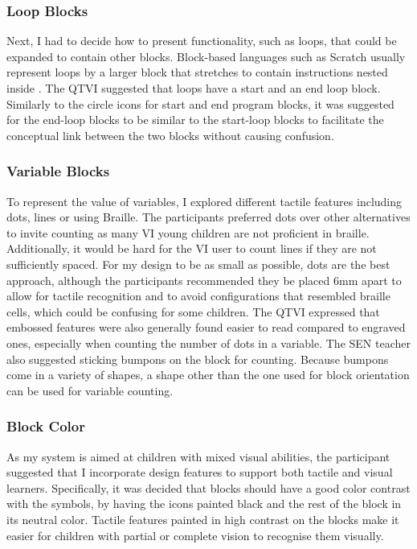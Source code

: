 \documentclass[oneside,%
                    author={Malak Hajji},
                    degree={BSc},
                    title={Designing An Accessible Computational Toolkit For Students},
                  subtitle={With Mixed Visual Abilities}]{dissertation}
\begin{document}
\subsubsection{Loop Blocks}
Next, I had to decide how to present functionality, such as loops, that could be expanded to contain other blocks.  Block-based languages such as Scratch usually represent loops by a larger block that stretches to contain instructions nested inside \cite{scratch}.
The QTVI suggested that loops have a start and an end loop block. Similarly to the circle icons for start and end program blocks, it was suggested for the end-loop blocks to be similar to the start-loop blocks to facilitate the conceptual link between the two blocks without causing confusion.
\subsubsection{Variable Blocks}
To represent the value of variables, I explored different tactile features including dots, lines or using Braille.
The participants preferred dots over other alternatives to invite counting as many VI young children are not proficient in braille. Additionally, it would be hard for the VI user to count lines if they are not sufficiently spaced. For my design to be as small as possible, dots are the best approach, although the participants recommended they be placed 6mm apart to allow for tactile recognition and to avoid configurations that resembled braille cells, which could be confusing for some children. The QTVI expressed that embossed features were also generally found easier to read compared to engraved ones, especially when counting the number of dots in a variable. The SEN teacher also suggested sticking bumpons on the block for counting. Because bumpons come in a variety of shapes, a shape other than the one used for block orientation can be used for variable counting.
\subsubsection{Block Color}
As my system is aimed at children with mixed visual abilities, the participant suggested that I incorporate design features to support both tactile and visual learners. Specifically, it was decided that blocks should have a good color contrast with the symbols, by having the icons painted black and the rest of the block in its neutral color. Tactile features painted in high contrast on the blocks make it easier for children with partial or complete vision to recognise them visually.
\end{document}
